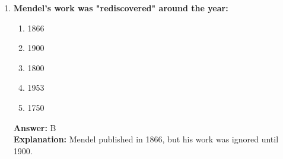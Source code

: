 \documentclass[11pt, a4paper]{article}
\begin{document}
\begin{enumerate}[leftmargin=*, label=\arabic*.]
\item \textbf{Mendel’s work was "rediscovered" around the year:}
\begin{enumerate}[label=\Alph*.]
\item 1866
\item 1900
\item 1800
\item 1953
\item 1750
\end{enumerate}
\textbf{Answer:} B \\
\textbf{Explanation:} Mendel published in 1866, but his work was ignored until 1900.

\end{enumerate}
\end{document}
